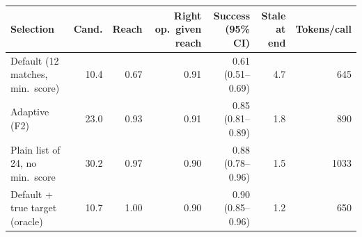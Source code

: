 \begin{tabular}{@{}lrrrrrr@{}}
\toprule
Selection & Cand. & Reach & Right op.\ given reach & Success (95\% CI) & Stale at end & Tokens/call \\
\midrule
Default (12 matches, min.\ score) & 10.4 & 0.67 & 0.91 & 0.61 (0.51--0.69) & 4.7 & 645 \\
Adaptive (F2) & 23.0 & 0.93 & 0.91 & 0.85 (0.81--0.89) & 1.8 & 890 \\
Plain list of 24, no min.\ score & 30.2 & 0.97 & 0.90 & 0.88 (0.78--0.96) & 1.5 & 1033 \\
Default + true target (oracle) & 10.7 & 1.00 & 0.90 & 0.90 (0.85--0.96) & 1.2 & 650 \\
\bottomrule
\end{tabular}
